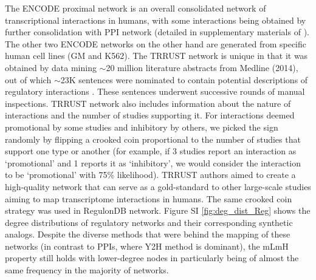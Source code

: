    The ENCODE proximal network is an overall consolidated network of transcriptional interactions in humans, with some interactions being obtained by further consolidation with PPI network (detailed in supplementary materials of  \cite{gerstein_architecture_2012}). The other two ENCODE networks on the other hand are generated from specific human cell lines (GM and K562). The TRRUST network is unique in that it was obtained by data mining ${\sim}$20 million literature abstracts from  Medline (2014), out of which ${\sim}$23K sentences were nominated to contain potential descriptions of regulatory interactions  \cite{han_trrust:_2015}. These sentences underwent successive rounds of manual inspections. TRRUST network also includes information about the nature of interactions and the number of studies supporting it. For interactions deemed promotional by some studies and inhibitory by others, we picked the sign randomly by flipping a crooked coin proportional to the number of studies that support one type or another (for example, if 3 studies report an interaction as `promotional' and 1 reports it as `inhibitory', we would consider the interaction to be `promotional' with 75\% likelihood). TRRUST authors aimed to create a high-quality network that can serve as a gold-standard to other large-scale studies aiming to map transcriptome interactions in humans. The same crooked coin strategy was used in RegulonDB network. Figure SI \ref{fig:deg_dist_Reg} shows the degree distributions of regulatory networks and their corresponding synthetic analogs. Despite the diverse methods that were behind the mapping of these networks (in contrast to PPIs, where Y2H method is dominant), the mLmH property still holds with lower-degree nodes in particularly being of almost the same frequency in the majority of networks.
    \newpage
